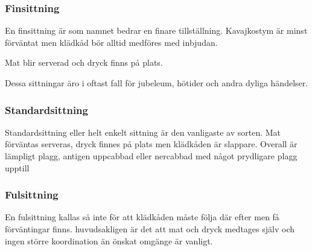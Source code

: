 \subsubsection{Finsittning}

En finsittning är som namnet bedrar en finare tillställning. Kavajkostym är minst förväntat men klädkåd bör alltid medföres med inbjudan. 

Mat blir serverad och dryck finns på plats. 

Dessa sittningar äro i oftast fall för jubeleum, hötider och andra dyliga händelser.

\subsubsection{Standardsittning}

Standardsittning eller helt enkelt sittning är den vanligaste av sorten. Mat förväntas serveras, dryck finnes på plats men klädkåden är slappare. Overall är lämpligt plagg, antigen uppcabbad eller nercabbad med något prydligare plagg upptill

\subsubsection{Fulsittning}

En fulsittning kallas så inte för att klädkåden måste följa där efter men få förväntingar finns. huvudsakligen är det att mat och dryck medtages själv och ingen större koordination än önskat omgänge är vanligt.



\newpage